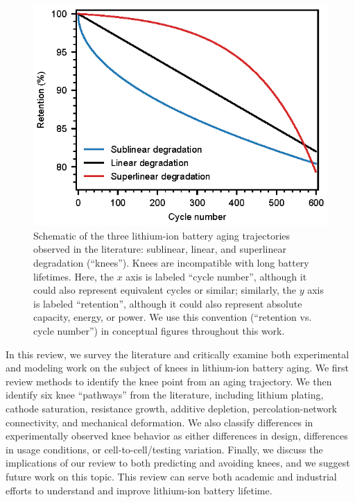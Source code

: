 \documentclass{article}
\begin{document}
\begin{figure}[ht]
\centering
\includegraphics[scale=1]{figures/degradation_rates.eps}
\caption{Schematic of the three lithium-ion battery aging trajectories observed in the literature: sublinear, linear, and superlinear degradation (``knees''). Knees are incompatible with long battery lifetimes. Here, the $x$ axis is labeled ``cycle number'', although it could also represent equivalent cycles or similar; similarly, the $y$ axis is labeled ``retention'', although it could also represent absolute capacity, energy, or power. We use this convention (``retention vs. cycle number'') in conceptual figures throughout this work.}
\label{fig:degradation_shapes}
\end{figure}


In this review, we survey the literature and critically examine both experimental and modeling work on the subject of knees in lithium-ion battery aging. We first review methods to identify the knee point from an aging trajectory. We then identify six knee ``pathways'' from the literature, including lithium plating, cathode saturation, resistance growth, additive depletion, percolation-network connectivity, and mechanical deformation. We also classify differences in experimentally observed knee behavior as either differences in design, differences in usage conditions, or cell-to-cell/testing variation. Finally, we discuss the implications of our review to both predicting and avoiding knees, and we suggest future work on this topic. This review can serve both academic and industrial efforts to understand and improve lithium-ion battery lifetime.
\end{document}
